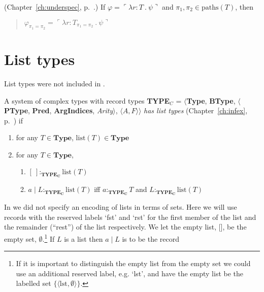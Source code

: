 (Chapter~\ref{ch:underspec}, p.~\pageref{ex:path-alignment-fcts}.)  If $\varphi=\ulcorner\lambda r\!:\!T\ .\ \psi\urcorner$ and
  $\pi_1,\pi_2\in\mathrm{paths}(T)$, then
  \begin{quote}
    $\varphi_{\pi_1=\pi_2}=\ulcorner\lambda r\!:\!T_{\pi_1=\pi_2}\ .\
    \psi\urcorner$
  \end{quote}
  

\section{List types}
\label{app:listtypes}

List types were not included in \cite{Cooper2012}.

A system of complex types with record types {\bf TYPE$_C$} = $\langle${\bf Type}, {\bf BType},
$\langle$\textbf{PType}, {\bf Pred}, \textbf{ArgIndices}, {\it
  Arity\/}$\rangle$, $\langle A,F\rangle$$\rangle$ \textit{has list
  types} (Chapter~\ref{ch:infex}, p.~\pageref{ex:listtypes}) if
\begin{enumerate} 
 
\item for any $T \in \textbf{Type}$, $\mathrm{list}(T) \in \textbf{Type}$ 
 
\item for any $T \in \textbf{Type}$, 
\begin{enumerate} 
 
\item $[\ ]:_{\mathbf{TYPE_C}}\mathrm{list}(T)$ 

\item $a\!\mid\! L:_{\mathbf{TYPE_C}}\mathrm{list}(T)$ iff
  $a:_{\mathbf{TYPE_C}}T$ and $L:_{\mathbf{TYPE_C}}\mathrm{list}(T)$ 
 
\end{enumerate}

\end{enumerate}

In \cite{Cooper2012}
we did not specify an encoding of lists in terms of sets.  Here we
will use records with the reserved labels
`fst' and `rst' for the first member of the list and the remainder
(``rest'') of
the list respectively.  We let the empty list, [], be the empty set,
$\emptyset$.\footnote{If it is important to distinguish the empty list
  from the empty set we could use an additional reserved label,
  e.g. `lst',  and
  have the empty list be the labelled set $\{\langle
  \mathrm{lst},\emptyset\rangle\}$.}  If $L$ is a list then $a\!\mid\! L$
is to be the record
\begin{quote}
\end{quote}

